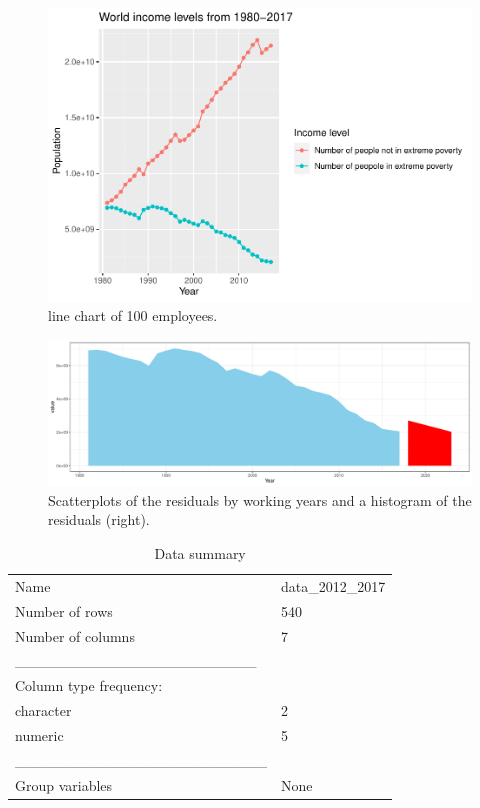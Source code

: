 \documentclass[
]{article}
\begin{document}
\begin{figure}[H]

{\centering \includegraphics[width=0.68\linewidth]{Poster_Formal_files/figure-latex/table1-1} 

}

\caption{\label{fig:line} line chart of 100 employees.}\label{fig:table1}
\end{figure}

\begin{figure}[H]

{\centering \includegraphics{Poster_Formal_files/figure-latex/creat modle-1} 

}

\caption{\label{fig:resids} Scatterplots of the residuals by working years and a histogram of the residuals (right).}\label{fig:creat modle}
\end{figure}

\begin{longtable}[]{@{}ll@{}}
\caption{Data summary}\tabularnewline
\toprule
\endhead
Name & data\_2012\_2017 \\
Number of rows & 540 \\
Number of columns & 7 \\
\_\_\_\_\_\_\_\_\_\_\_\_\_\_\_\_\_\_\_\_\_\_\_ & \\
Column type frequency: & \\
character & 2 \\
numeric & 5 \\
\_\_\_\_\_\_\_\_\_\_\_\_\_\_\_\_\_\_\_\_\_\_\_\_ & \\
Group variables & None \\
\bottomrule
\end{longtable}
\end{document}
